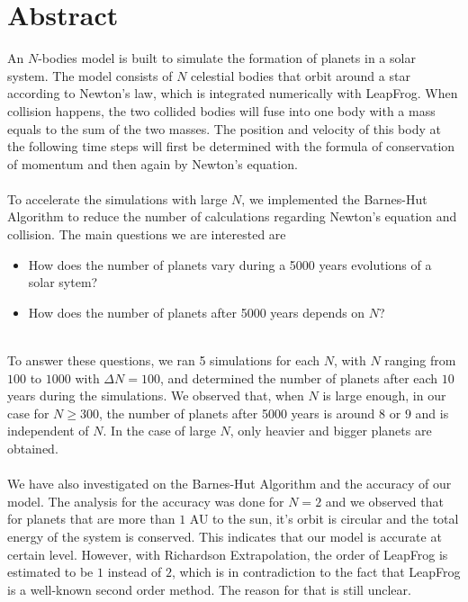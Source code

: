 \section*{Abstract}
An $N$-bodies model is built to simulate the formation of planets in a solar system. The model consists of $N$ celestial bodies that orbit around a star according to Newton's law, which is integrated numerically with LeapFrog. When collision happens, the two collided bodies will fuse into one body with a mass equals to the sum of the two masses. The position and velocity of this body at the following time steps will first be determined with the formula of conservation of momentum and then again by Newton's equation.\\
\\
To accelerate the simulations with large $N$, we implemented the Barnes-Hut Algorithm to reduce the number of calculations regarding Newton's equation and collision. The main questions we are interested are
\begin{itemize}
\item How does the number of planets vary during a 5000 years evolutions of a solar sytem?

\item How does the number of planets after 5000 years depends on $N$?
\end{itemize}
\leavevmode
\\
To answer these questions, we ran 5 simulations for each $N$, with $N$ ranging from $100$ to $1000$ with $\Delta N=100$, and determined the number of planets after each $10$ years during the simulations. We observed that, when $N$ is large enough, in our case for $N\geq 300$, the number of planets after 5000 years is around $8$ or $9$ and is independent of $N$. In the case of large $N$, only heavier and bigger planets are obtained.\\
\\
We have also investigated on the Barnes-Hut Algorithm and the accuracy of our model. The analysis for the accuracy was done for $N=2$ and we observed that for planets that are more than $1$ AU to the sun, it's orbit is circular and the total energy of the system is conserved. This indicates that our model is accurate at certain level. However, with Richardson Extrapolation, the order of LeapFrog is estimated to be $1$ instead of $2$, which is in contradiction to the fact that LeapFrog is a well-known second order method. The reason for that is still unclear.